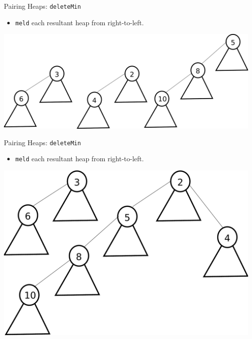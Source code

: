 \documentclass{beamer}
\begin{document}
\begin{frame}{Pairing Heaps: \texttt{deleteMin}}
  \begin{itemize}
    \item \texttt{meld} each resultant heap from right-to-left.
  \end{itemize}
  \includegraphics[scale=0.25]{img/deleteMin3.pdf}
\end{frame}

\begin{frame}{Pairing Heaps: \texttt{deleteMin}}
  \begin{itemize}
    \item \texttt{meld} each resultant heap from right-to-left.
  \end{itemize}
  \includegraphics[scale=0.25]{img/deleteMin4.pdf}
\end{frame}
\end{document}
